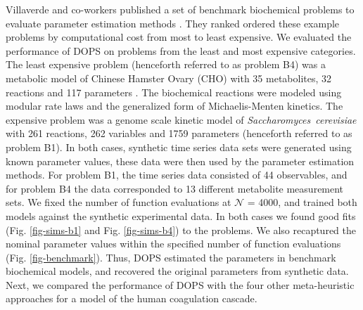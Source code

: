 \documentclass[12pt]{article}
\begin{document}
Villaverde and co-workers published a set of benchmark biochemical problems to evaluate parameter estimation methods \cite{villaverde2015biopredyn}.
They ranked ordered these example problems by computational cost from most to least expensive.
We evaluated the performance of DOPS on problems from the least and most expensive categories.
The least expensive problem (henceforth referred to as problem B4) was a metabolic model of Chinese Hamster Ovary (CHO) with 35 metabolites, 32 reactions and 117 parameters \cite{villaverde2014high}.
The biochemical reactions were modeled using modular rate laws and the generalized form of Michaelis-Menten kinetics.
The expensive problem was a genome scale kinetic model of \textit{Saccharomyces~cerevisiae} with 261 reactions, 262 variables and 1759 parameters \cite {smallbone2013large}(henceforth referred to as problem B1). In both cases, synthetic time series data sets were generated using known parameter values, these data were then used by the parameter estimation methods.
For problem B1, the time series data consisted of 44 observables, and for problem B4 the data corresponded to 13 different metabolite measurement sets.
We fixed the number of function evaluations at $\mathcal{N}$ = 4000, and trained both models against the synthetic experimental data.
In both cases we found good fits  (Fig. \ref{fig-sims-b1} and Fig. \ref{fig-sims-b4}) to the problems.
We also recaptured the nominal parameter values within the specified number of function evaluations (Fig. \ref{fig-benchmark}).
Thus, DOPS estimated the parameters in benchmark biochemical models, and recovered the original parameters from synthetic data.
Next, we compared the performance of DOPS with the four other meta-heuristic approaches for a model of the human coagulation cascade.

\end{document}
